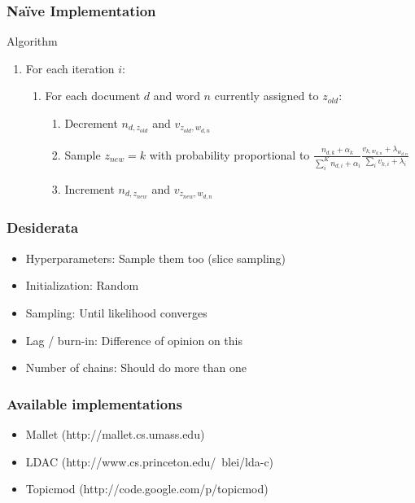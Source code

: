 \documentclass[xcolor=dvipsnames]{beamer}
\begin{document}
\begin{frame}

\frametitle{Na\"ive Implementation}

\begin{block}{Algorithm}
\begin{enumerate}
\item For each iteration $i$:
\begin{enumerate}
\item For each document $d$ and word $n$ currently assigned to $z_{old}$:
\begin{enumerate}
\item Decrement $n_{d,z_{old}}$ and $v_{z_{old}, w_{d,n}}$
\item Sample $z_{new} = k$ with probability proportional to $\frac{n_{d, k} + \alpha_k}{ \sum_{i}^{K} { n_{d,i} + \alpha_i}} \frac{v_{k, w_{d,n}} + \lambda_{w_{d,n}}}{ \sum_{i} { v_{k,i} + \lambda_{i}}}$
\item Increment $n_{d,z_{new}}$ and $v_{z_{new}, w_{d,n}}$
\end{enumerate}
\end{enumerate}
\end{enumerate}
\end{block}

\end{frame}

\begin{frame}
\frametitle{Desiderata}
\begin{itemize}
\item Hyperparameters: Sample them too (slice sampling)
\item Initialization: Random
\item Sampling: Until likelihood converges
\item Lag / burn-in: Difference of opinion on this
\item Number of chains: Should do more than one
\end{itemize}
\end{frame}


\begin{frame}
	\frametitle{Available implementations}

	\begin{itemize}
		\item Mallet (http://mallet.cs.umass.edu)
		\item LDAC (http://www.cs.princeton.edu/~blei/lda-c)
		\item Topicmod (http://code.google.com/p/topicmod)
	\end{itemize}
\end{frame}
\end{document}
